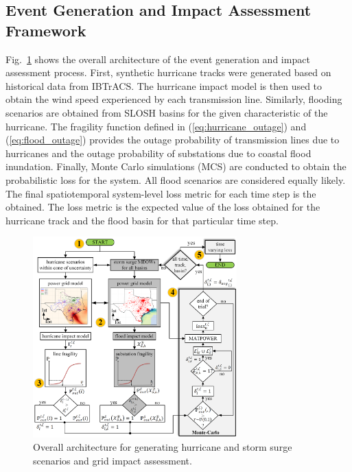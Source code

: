 \subsection{Event Generation and Impact Assessment Framework}
Fig.~\ref{fig:overall_architecture} shows the overall architecture of the event generation and impact assessment process. First, synthetic hurricane tracks were generated based on historical data from IBTrACS. The hurricane impact model is then used to obtain the wind speed experienced by each transmission line. Similarly, flooding scenarios are obtained from SLOSH basins for the given characteristic of the hurricane. The fragility function defined in (\ref{eq:hurricane_outage}) and (\ref{eq:flood_outage}) provides the outage probability of transmission lines due to hurricanes and the outage probability of substations due to coastal flood inundation. Finally, Monte Carlo simulations (MCS) are conducted to obtain the probabilistic loss for the system. All flood scenarios are considered equally likely. The final spatiotemporal system-level loss metric for each time step is the obtained. The loss metric is the expected value of the loss obtained for the hurricane track and the flood basin for that particular time step.


\begin{figure}[t]
    \centering
    \includegraphics[width=0.7\textwidth]{figures/overall_framework.png}
   \caption{Overall architecture for generating hurricane and storm surge scenarios and grid impact assessment.}
    \label{fig:overall_architecture}
    \vspace{-5pt}
\end{figure}

